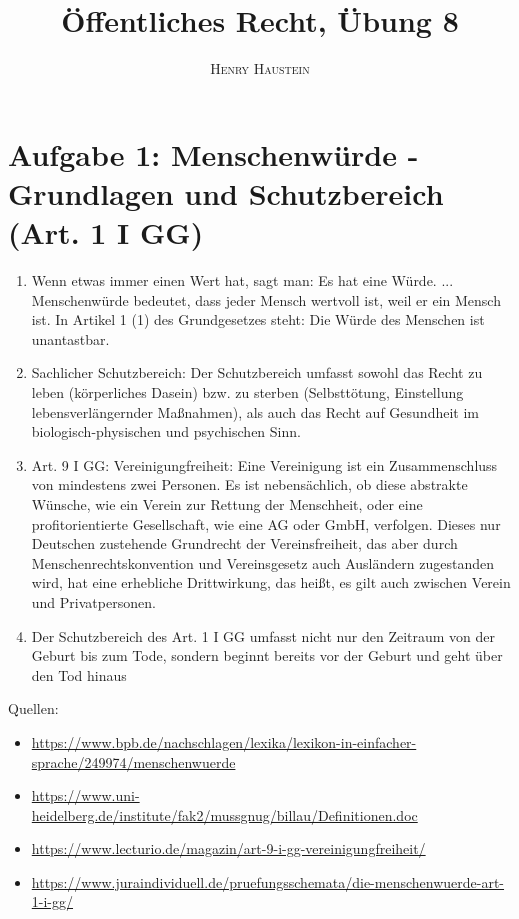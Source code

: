 \documentclass{article}
\title{\textbf{Öffentliches Recht, Übung 8}}
\author{\textsc{Henry Haustein}}
\date{}
\begin{document}
	\maketitle
	
	\section*{Aufgabe 1: Menschenwürde - Grundlagen und Schutzbereich (Art. 1 I GG)}
	\begin{enumerate}[label=(\alph*)]
		\item Wenn etwas immer einen Wert hat, sagt man: Es hat eine Würde. ... Menschenwürde bedeutet, dass jeder Mensch wertvoll ist, weil er ein Mensch ist. In Artikel 1 (1) des Grundgesetzes steht: Die Würde des Menschen ist unantastbar.
		\item Sachlicher Schutzbereich: Der Schutzbereich umfasst sowohl das Recht zu leben (körperliches Dasein) bzw. zu sterben (Selbsttötung, Einstellung lebensverlängernder Maßnahmen), als auch das Recht auf Gesundheit im biologisch-physischen und psychischen Sinn.
		\item Art. 9 I GG: Vereinigungfreiheit: Eine Vereinigung ist ein Zusammenschluss von mindestens zwei Personen. Es ist nebensächlich, ob diese abstrakte Wünsche, wie ein Verein zur Rettung der Menschheit, oder eine profitorientierte Gesellschaft, wie eine AG oder GmbH, verfolgen. Dieses nur Deutschen zustehende Grundrecht der Vereinsfreiheit, das aber durch Menschenrechtskonvention und Vereinsgesetz auch Ausländern zugestanden wird, hat eine erhebliche Drittwirkung, das heißt, es gilt auch zwischen Verein und Privatpersonen.
		\item Der Schutzbereich des Art. 1 I GG umfasst nicht nur den Zeitraum von der Geburt bis zum Tode, sondern beginnt bereits vor der Geburt und geht über den Tod hinaus
	\end{enumerate}

	Quellen:
	\begin{itemize}
		\item \url{https://www.bpb.de/nachschlagen/lexika/lexikon-in-einfacher-sprache/249974/menschenwuerde}
		\item \url{https://www.uni-heidelberg.de/institute/fak2/mussgnug/billau/Definitionen.doc}
		\item \url{https://www.lecturio.de/magazin/art-9-i-gg-vereinigungfreiheit/}
		\item \url{https://www.juraindividuell.de/pruefungsschemata/die-menschenwuerde-art-1-i-gg/}
	\end{itemize}
\end{document}
